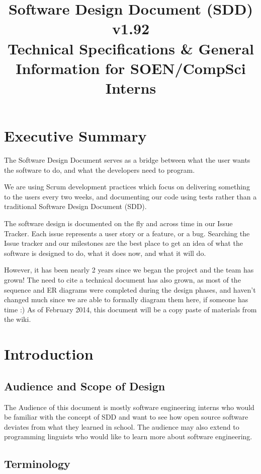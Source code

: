 \documentclass[12pt]{article}
\title{Software Design Document (SDD) v1.92\\  \small{ Technical Specifications \& General Information for SOEN/CompSci Interns}}
\author{}
\begin{document}
\maketitle{} 

\tableofcontents

\newpage
\section*{Executive Summary}

The Software Design Document serves as a bridge between what the user wants the software to do, and what the developers need to program.

We are using Scrum development practices which focus on delivering something to the users every two weeks, and documenting our code using tests rather than a traditional Software Design Document (SDD).

The software design is documented on the fly and across time in our Issue Tracker. Each issue represents a user story or a feature, or a bug. Searching the Issue tracker and our milestones are the best place to get an idea of what the software is designed to do, what it does now, and what it will do.

However, it has been nearly 2 years since we began the project and the team has grown! The need to cite a technical document has also grown, as most of the sequence and ER diagrams were completed during the design phases, and haven't changed much since we are able to formally diagram them here, if someone has time :) As of February 2014, this document will be a copy paste of materials from the wiki.

\section{Introduction}


\subsection{Audience and Scope of Design}

The Audience of this document is mostly software engineering interns who would be familiar with the concept of SDD and want to see how open source software deviates from what they learned in school. The audience may also extend to programming linguists who would like to learn more about software engineering.

\subsection{Terminology}
\end{document}
